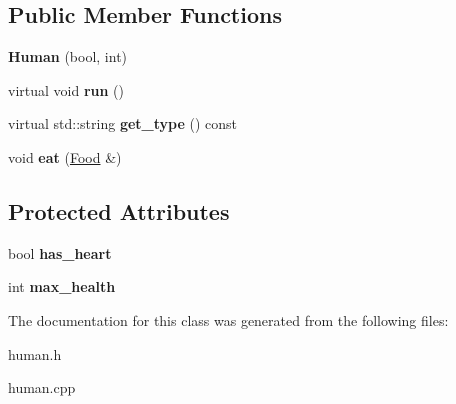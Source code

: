 \subsection*{Public Member Functions}
\begin{DoxyCompactItemize}
\item 
\hypertarget{classda__game_1_1Human_aed0a521eea5a8fa1cce0bc0accd616ae}{
{\bfseries Human} (bool, int)}
\label{classda__game_1_1Human_aed0a521eea5a8fa1cce0bc0accd616ae}

\item 
\hypertarget{classda__game_1_1Human_a7861ade5e3d97c1945690f961f6aa2f0}{
virtual void {\bfseries run} ()}
\label{classda__game_1_1Human_a7861ade5e3d97c1945690f961f6aa2f0}

\item 
\hypertarget{classda__game_1_1Human_ae8cf665bea081f6eb7cb9889e77ceafb}{
virtual std::string {\bfseries get\_\-type} () const }
\label{classda__game_1_1Human_ae8cf665bea081f6eb7cb9889e77ceafb}

\item 
\hypertarget{classda__game_1_1Human_a2700b5d52961ba140d14d4da246b1a77}{
void {\bfseries eat} (\hyperlink{classda__game_1_1Food}{Food} \&)}
\label{classda__game_1_1Human_a2700b5d52961ba140d14d4da246b1a77}

\end{DoxyCompactItemize}
\subsection*{Protected Attributes}
\begin{DoxyCompactItemize}
\item 
\hypertarget{classda__game_1_1Human_a1b81e3167c625be17bb25e1edf273a77}{
bool {\bfseries has\_\-heart}}
\label{classda__game_1_1Human_a1b81e3167c625be17bb25e1edf273a77}

\item 
\hypertarget{classda__game_1_1Human_a4e47ed43e00e5604e671e432c008d764}{
int {\bfseries max\_\-health}}
\label{classda__game_1_1Human_a4e47ed43e00e5604e671e432c008d764}

\end{DoxyCompactItemize}


The documentation for this class was generated from the following files:\begin{DoxyCompactItemize}
\item 
human.h\item 
human.cpp\end{DoxyCompactItemize}

